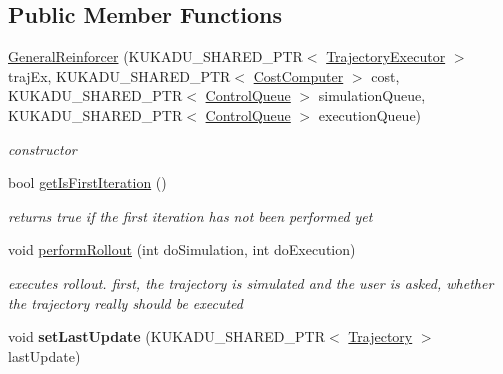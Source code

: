 \subsection*{Public Member Functions}
\begin{DoxyCompactItemize}
\item 
\hyperlink{classkukadu_1_1GeneralReinforcer_a1de3f2b46e82b37454f8095701992c8d}{General\+Reinforcer} (K\+U\+K\+A\+D\+U\+\_\+\+S\+H\+A\+R\+E\+D\+\_\+\+P\+TR$<$ \hyperlink{classkukadu_1_1TrajectoryExecutor}{Trajectory\+Executor} $>$ traj\+Ex, K\+U\+K\+A\+D\+U\+\_\+\+S\+H\+A\+R\+E\+D\+\_\+\+P\+TR$<$ \hyperlink{classkukadu_1_1CostComputer}{Cost\+Computer} $>$ cost, K\+U\+K\+A\+D\+U\+\_\+\+S\+H\+A\+R\+E\+D\+\_\+\+P\+TR$<$ \hyperlink{classkukadu_1_1ControlQueue}{Control\+Queue} $>$ simulation\+Queue, K\+U\+K\+A\+D\+U\+\_\+\+S\+H\+A\+R\+E\+D\+\_\+\+P\+TR$<$ \hyperlink{classkukadu_1_1ControlQueue}{Control\+Queue} $>$ execution\+Queue)
\begin{DoxyCompactList}\small\item\em constructor \end{DoxyCompactList}\item 
bool \hyperlink{classkukadu_1_1GeneralReinforcer_aa384f66bcf7487b449dc67c768e86f5e}{get\+Is\+First\+Iteration} ()\hypertarget{classkukadu_1_1GeneralReinforcer_aa384f66bcf7487b449dc67c768e86f5e}{}\label{classkukadu_1_1GeneralReinforcer_aa384f66bcf7487b449dc67c768e86f5e}

\begin{DoxyCompactList}\small\item\em returns true if the first iteration has not been performed yet \end{DoxyCompactList}\item 
void \hyperlink{classkukadu_1_1GeneralReinforcer_aee9cbeaac91379e1926088150f9c5063}{perform\+Rollout} (int do\+Simulation, int do\+Execution)
\begin{DoxyCompactList}\small\item\em executes rollout. first, the trajectory is simulated and the user is asked, whether the trajectory really should be executed \end{DoxyCompactList}\item 
void {\bfseries set\+Last\+Update} (K\+U\+K\+A\+D\+U\+\_\+\+S\+H\+A\+R\+E\+D\+\_\+\+P\+TR$<$ \hyperlink{classkukadu_1_1Trajectory}{Trajectory} $>$ last\+Update)\hypertarget{classkukadu_1_1GeneralReinforcer_a0fe9f486ada94bb1eeeb6e460da5579f}{}\label{classkukadu_1_1GeneralReinforcer_a0fe9f486ada94bb1eeeb6e460da5579f}


\end{DoxyCompactItemize}
